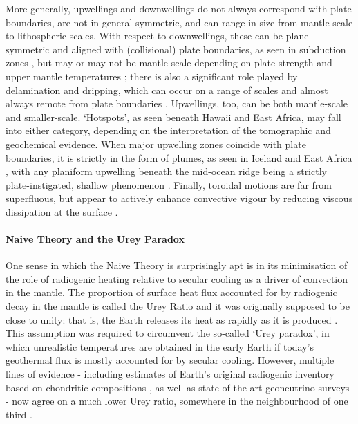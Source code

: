\documentclass[a4paper,11pt,oneside]{book}
\begin{document}
More generally, upwellings and downwellings do not always correspond with plate boundaries, are not in general symmetric, and can range in size from mantle-scale to lithospheric scales. With respect to downwellings, these can be plane-symmetric and aligned with (collisional) plate boundaries, as seen in subduction zones \cite{Zhao2009-zo}, but may or may not be mantle scale depending on plate strength and upper mantle temperatures \citet{Tanimoto2000-dw, Cizkova2019-tq}; there is also a significant role played by delamination and dripping, which can occur on a range of scales and almost always remote from plate boundaries \cite{Beall2017-jr}. Upwellings, too, can be both mantle-scale and smaller-scale. `Hotspots', as seen beneath Hawaii and East Africa, may fall into either category, depending on the interpretation of the tomographic and geochemical evidence. When major upwelling zones coincide with plate boundaries, it is strictly in the form of plumes, as seen in Iceland and East Africa \cite{Lithgow-Bertelloni1998-or}, with any planiform upwelling beneath the mid-ocean ridge being a strictly plate-instigated, shallow phenomenon \cite{Melt1998-yg}. Finally, toroidal motions are far from superfluous, but appear to actively enhance convective vigour by reducing viscous dissipation at the surface \cite{Bercovici-vk}.

\paragraph{Naive Theory and the Urey Paradox}

One sense in which the Naive Theory is surprisingly apt is in its minimisation of the role of radiogenic heating relative to secular cooling as a driver of convection in the mantle. The proportion of surface heat flux accounted for by radiogenic decay in the mantle is called the Urey Ratio \cite{Turcotte2014-by} and it was originally supposed to be close to unity: that is, the Earth releases its heat as rapidly as it is produced \cite{Urey1955-zs}. This assumption was required to circumvent the so-called `Urey paradox', in which unrealistic temperatures are obtained in the early Earth if today's geothermal flux is mostly accounted for by secular cooling. However, multiple lines of evidence - including estimates of Earth's original radiogenic inventory based on chondritic compositions \cite{Korenaga2003-oy}, as well as state-of-the-art geoneutrino surveys \citet{Gando2011-sh, Mareschal2012-ie, Huang2013-eu, Machulin2015-pj} - now agree on a much lower Urey ratio, somewhere in the neighbourhood of one third \citet{Mareschal2012-ie, Korenaga2011-ow}.
\end{document}
